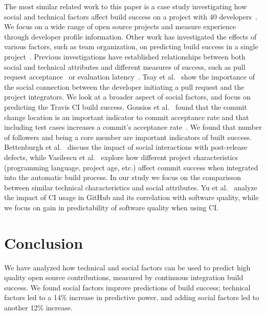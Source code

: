 \documentclass[10pt, conference]{IEEEtran}
\begin{document}
The most similar related work to this paper is a case study investigating how
social and technical factors affect build
success on a project with 40 developers~\cite{Hassan06}.
We focus on a wide range of open source projects and
measure experience through developer profile information.
Other work has investigated the effects of various factors, such as team
organization, on predicting build success in a single
project~\cite{Kwan11,Wolf09}.
Previous investigations have established relationships between both social and 
technical 
attributes and 
different measures of success, such as pull request acceptance~\cite{gousios14, 
gousios15,tsay14icse,tsay14fse} or evaluation latency~\cite{Yu15}.
Tsay et al.~\cite{tsay14icse} 
show the importance of the social connection between the developer initiating a
pull request and the project integrators. We look at a broader aspect of 
social factors, and focus on predicting the Travis CI build success.
Gousios et al.~\cite{gousios14} found that the commit change location is
an important indicator to commit acceptance rate and that including
test cases increases a
commit's acceptance rate~\cite{gousios15}. We found that number of followers and being a core member are important indicators of built success. 
Bettenburgh et 
al.~\cite{bettenburgh10} discuss the impact of social interactions with 
post-release defects, while Vasilescu et al.~\cite{vasilescu14} explore how different 
project characteristics (programming language, project age, etc.) affect commit 
success when integrated into the automatic build process. In our study we focus on the comparisson between similar technical characteristics and social attributes. Yu et al.~\cite{yu16} 
analyze the impact of CI usage in GitHub and its correlation with software 
quality, while we focus on gain in predictability of software quality when using CI.

\balance
\section{Conclusion}

We have analyzed how technical and social factors can be used to
predict high quality open source contributions, measured by continuous
integration build success.  We found social factors improve predictions of build 
success; technical factors led to a 14\% increase in predictive power, and 
adding social factors led to another 12\% increase. 
\end{document}

